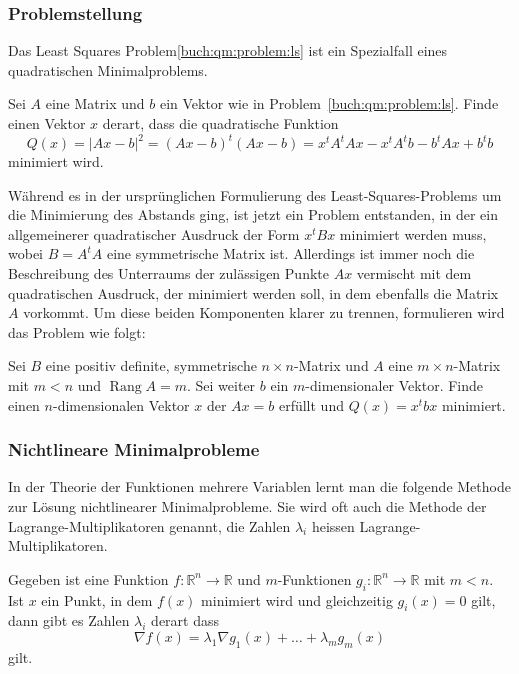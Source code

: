 %
%
\subsubsection{Problemstellung}
Das Least Squares Problem\ref{buch:qm:problem:ls} ist ein Spezialfall eines
quadratischen Minimalproblems.

\begin{problem}
\label{buch:qm:problem:ls2}
Sei $A$ eine Matrix und $b$ ein Vektor wie in Problem~\ref{buch:qm:problem:ls}.
Finde einen Vektor $x$ derart, dass die quadratische Funktion
\begin{equation}
Q(x)
=
|Ax-b|^2
=
(Ax-b)^t(Ax-b)
=
x^tA^tAx -x^tA^tb - b^tAx +b^t b
\label{buch:qm:eqn:ls2}
\end{equation}
minimiert wird.
\end{problem}

Während es in der ursprünglichen Formulierung des Least-Squares-Problems
um die Minimierung des Abstands ging, ist jetzt ein Problem entstanden,
in der ein allgemeinerer quadratischer Ausdruck der Form $x^tBx$ 
minimiert werden muss, wobei $B=A^tA$ eine symmetrische Matrix ist.
Allerdings ist immer noch die Beschreibung des Unterraums der zulässigen
Punkte $Ax$ vermischt mit dem quadratischen Ausdruck, der minimiert werden
soll, in dem ebenfalls die Matrix $A$ vorkommt.
Um diese beiden Komponenten klarer zu trennen, formulieren wird das
Problem wie folgt:

\begin{problem}
\label{buch:qm:problem:allg}
Sei $B$ eine positiv definite, symmetrische $n\times n$-Matrix 
und $A$ eine $m\times n$-Matrix mit $m<n$ und $\operatorname{Rang}A=m$.
Sei weiter $b$ ein $m$-dimensionaler Vektor.
Finde einen $n$-dimensionalen Vektor $x$ der $Ax=b$ erfüllt und
$Q(x)=x^tbx$ minimiert.
\end{problem}

%
%
\subsubsection{Nichtlineare Minimalprobleme}
In der Theorie der Funktionen mehrere Variablen lernt man die folgende
Methode zur Lösung nichtlinearer Minimalprobleme.
Sie wird oft auch die Methode der Lagrange-Multiplikatoren genannt,
die Zahlen $\lambda_i$ heissen Lagrange-Multiplikatoren.

\begin{lemma}
\label{buch:qm:lemma:lagrangemultiplikatoren}
Gegeben ist eine Funktion $f\colon \mathbb R^n \to \mathbb R$
und $m$-Funktionen $g_i\colon\mathbb R^n \to \mathbb R$ mit $m<n$.
Ist $x$ ein Punkt, in dem $f(x)$ minimiert wird und gleichzeitig
$g_i(x)=0$ gilt, dann gibt es Zahlen $\lambda_i$ derart dass
\[
\nabla f(x) = \lambda_1 \nabla g_1(x)  + \dots + \lambda_m g_m(x)
\]
gilt.
\end{lemma}

